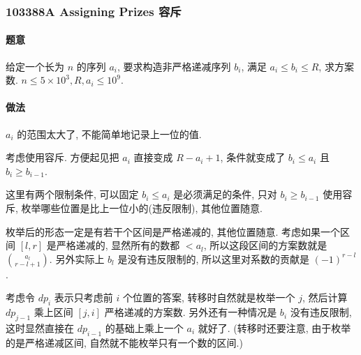 \subsubsection{103388A Assigning Prizes 容斥}
	
	\paragraph{题意} 给定一个长为 $n$ 的序列 $a_i$, 要求构造非严格递减序列 $b_i$, 满足 $a_i \le b_i \le R$, 求方案数. $n \le 5 \times 10 ^ 3, R, a_i \le 10 ^ 9$.
	
	\paragraph{做法} $a_i$ 的范围太大了, 不能简单地记录上一位的值.

	考虑使用容斥. 方便起见把 $a_i$ 直接变成 $R - a_i + 1$, 条件就变成了 $b_i \le a_i$ 且 $b_i \ge b_{i - 1}$.

	这里有两个限制条件, 可以固定 $b_i \le a_i$ 是必须满足的条件, 只对 $b_i \ge b_{i - 1}$ 使用容斥, 枚举哪些位置是比上一位小的(违反限制), 其他位置随意.

	枚举后的形态一定是有若干个区间是严格递减的, 其他位置随意. 考虑如果一个区间 $[l, r]$ 是严格递减的, 显然所有的数都 $< a_l$, 所以这段区间的方案数就是 ${a_l \choose r - l + 1}$. 另外实际上 $b_l$ 是没有违反限制的, 所以这里对系数的贡献是 $(-1) ^ {r - l}$.

	考虑令 $dp_i$ 表示只考虑前 $i$ 个位置的答案, 转移时自然就是枚举一个 $j$, 然后计算 $dp_{j - 1}$ 乘上区间 $[j, i]$ 严格递减的方案数. 另外还有一种情况是 $b_i$ 没有违反限制, 这时显然直接在 $dp_{i - 1}$ 的基础上乘上一个 $a_i$ 就好了. (转移时还要注意, 由于枚举的是严格递减区间, 自然就不能枚举只有一个数的区间.)

	\inputminted{cpp}{../src/dp/103388A.cpp}